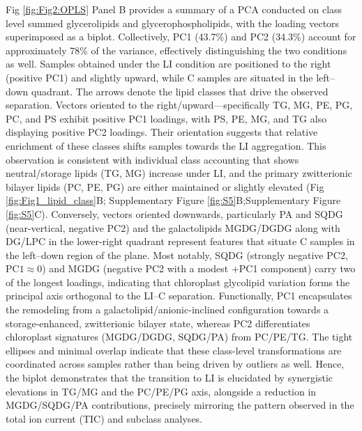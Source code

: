\documentclass[10pt,letterpaper]{article}
\begin{document}
Fig \ref{fig:Fig2:OPLS} Panel B provides a summary of a PCA conducted on class level summed glycerolipids and glycerophospholipids, with the loading vectors superimposed as a biplot. Collectively, PC1 (43.7\%) and PC2 (34.3\%) account for approximately 78\% of the variance, effectively distinguishing the two conditions as well. Samples obtained under the LI condition are positioned to the right (positive PC1) and slightly upward, while C samples are situated in the left–down quadrant. The arrows denote the lipid classes that drive the observed separation. Vectors oriented to the right/upward—specifically TG, MG, PE, PG, PC, and PS exhibit positive PC1 loadings, with PS, PE, MG, and TG also displaying positive PC2 loadings. Their orientation suggests that relative enrichment of these classes shifts samples towards the LI aggregation. This observation is consistent with individual class accounting that shows neutral/storage lipids (TG, MG) increase under LI, and the primary zwitterionic bilayer lipids (PC, PE, PG) are either maintained or slightly elevated (Fig \ref{fig:Fig1_lipid_class}B; Supplementary Figure \ref{fig:S5}B;Supplementary Figure \ref{fig:S5}C). Conversely, vectors oriented downwards, particularly PA and SQDG (near-vertical, negative PC2) and the galactolipids MGDG/DGDG along with DG/LPC in the lower-right quadrant represent features that situate C samples in the left–down region of the plane. Most notably, SQDG (strongly negative PC2, $\mathrm{PC1} \approx 0$) and MGDG (negative PC2 with a modest +PC1 component) carry two of the longest loadings, indicating that chloroplast glycolipid variation forms the principal axis orthogonal to the LI–C separation. Functionally, PC1 encapsulates the remodeling from a galactolipid/anionic-inclined configuration towards a storage-enhanced, zwitterionic bilayer state, whereas PC2 differentiates chloroplast signatures (MGDG/DGDG, SQDG/PA) from PC/PE/TG. The tight ellipses and minimal overlap indicate that these class-level transformations are coordinated across samples rather than being driven by outliers as well. Hence, the biplot demonstrates that the transition to LI is elucidated by synergistic elevations in TG/MG and the PC/PE/PG axis, alongside a reduction in MGDG/SQDG/PA contributions, precisely mirroring the pattern observed in the total ion current (TIC) and subclass analyses.
\end{document}
